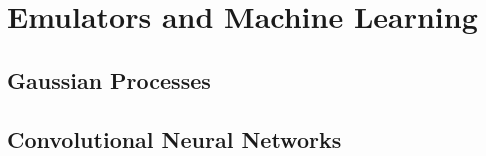 \chapter{Emulators and Machine Learning}
\section{Gaussian Processes}

\section{Convolutional Neural Networks}